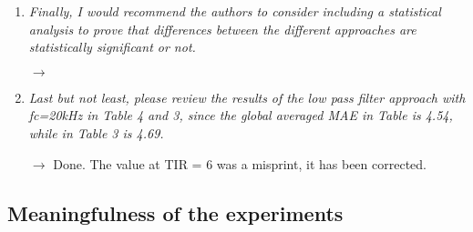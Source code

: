 \documentclass[10pt]{article}
\begin{document}
\begin{enumerate}
\item \emph{Finally, I would recommend the authors to consider including a statistical analysis to prove that differences between the different approaches are statistically significant or not.}

$\rightarrow$ 

\item \emph{Last but not least, please review the results of the low pass filter approach with fc=20kHz in Table 4 and 3, since the global averaged MAE in Table is 4.54, while in Table 3 is 4.69.}

$\rightarrow$ Done. The value at TIR = 6 was a misprint, it has been corrected.


\end{enumerate}

\subsection{Meaningfulness of the experiments}
\end{document}
